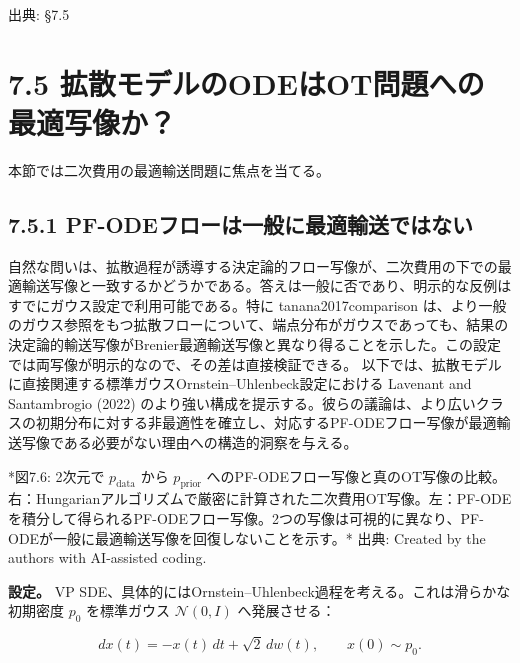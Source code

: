 

{\color{gray}\footnotesize 出典: §7.5\par}
\vspace{0.2em}

\section*{7.5 拡散モデルのODEはOT問題への最適写像か？}


本節では二次費用の最適輸送問題に焦点を当てる。

\subsection*{7.5.1 PF-ODEフローは一般に最適輸送ではない}


自然な問いは、拡散過程が誘導する決定論的フロー写像が、二次費用の下での最適輸送写像と一致するかどうかである。答えは一般に否であり、明示的な反例はすでにガウス設定で利用可能である。特に tanana2017comparison は、より一般のガウス参照をもつ拡散フローについて、端点分布がガウスであっても、結果の決定論的輸送写像がBrenier最適輸送写像と異なり得ることを示した。この設定では両写像が明示的なので、その差は直接検証できる。
以下では、拡散モデルに直接関連する標準ガウスOrnstein–Uhlenbeck設定における Lavenant and Santambrogio (2022) のより強い構成を提示する。彼らの議論は、より広いクラスの初期分布に対する非最適性を確立し、対応するPF-ODEフロー写像が最適輸送写像である必要がない理由への構造的洞察を与える。



*図7.6: 2次元で $p_{\mathrm{data}}$ から $p_{\mathrm{prior}}$ へのPF-ODEフロー写像と真のOT写像の比較。右：Hungarianアルゴリズムで厳密に計算された二次費用OT写像。左：PF-ODEを積分して得られるPF-ODEフロー写像。2つの写像は可視的に異なり、PF-ODEが一般に最適輸送写像を回復しないことを示す。*
出典: Created by the authors with AI-assisted coding.

\textbf{設定。} VP SDE、具体的にはOrnstein–Uhlenbeck過程を考える。これは滑らかな初期密度 $p_0$ を標準ガウス $\mathcal{N}(0,I)$ へ発展させる：

\[
dx(t)=-x(t)\,dt+\sqrt{2}\,dw(t),\qquad x(0)\sim p_0.
\]


